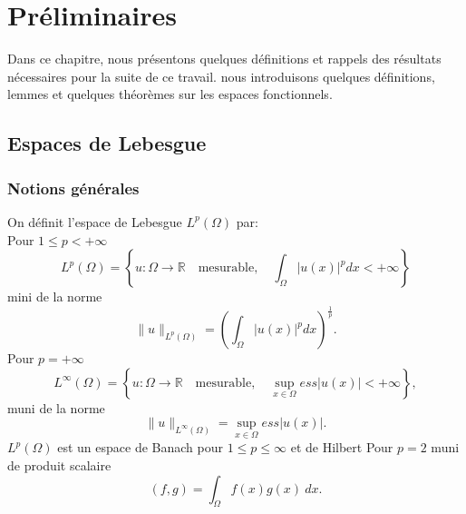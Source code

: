 \documentclass[12pt,a4paper]{book}
\begin{document}
\chapter{Préliminaires}
				
Dans ce chapitre, nous présentons quelques définitions et rappels des résultats nécessaires pour la suite de ce travail. nous introduisons quelques définitions, lemmes et  quelques théorèmes sur les espaces fonctionnels.
				
\section{Espaces de Lebesgue}

\subsection{Notions générales}

\begin{definition}{}{} On définit l'espace de Lebesgue $L^{p}(\Omega)$ par:\\	Pour $1\leq p <+\infty$ 
\[
L^{p}(\Omega)=\left\lbrace   u:\Omega\longrightarrow \mathbb{R}\quad \mbox{mesurable} , \quad \int_{\Omega} \lvert u(x)\rvert^{p} dx <+\infty \right\rbrace
\]
	mini de la norme 
	$$ \lVert u\rVert_{L^{p}(\Omega)}=\left(   \int_{\Omega} \lvert u(x)\rvert^{p} dx \right)      ^{\frac{1}{p}}.$$
	Pour $p=+\infty$ 
	$$ L^{\infty}(\Omega)=\left\lbrace u:\Omega\longrightarrow{\mathbb{R}}\quad \mbox{mesurable},\quad \sup\limits_{x\in \Omega} \textit{ess} \lvert u(x) \rvert< +\infty\right\rbrace ,$$
	muni de la norme
	$$  \lVert u\rVert_{L^{\infty}(\Omega)}=\sup\limits_{x\in \Omega}\textit{ess}\lvert u(x) \rvert.$$
	$L^{p}(\Omega)$ est un espace de Banach pour $ 1\leq p \leq \infty $ et de Hilbert Pour $p=2$ muni de produit scalaire
	$$ ( f,g)=\int_{\Omega}f(x)g(x)   ~ dx.$$
\end{definition}
\end{document}
